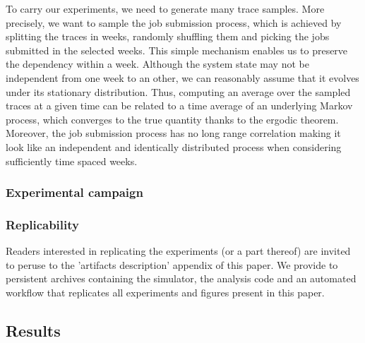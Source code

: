 \documentclass[sigconf,review]{acmart}
\begin{document}

To carry our experiments, we need to generate many trace samples. More
precisely, we want to sample the job submission process, which is achieved by
splitting the traces in weeks, randomly shuffling them and picking the jobs
submitted in the selected weeks.  This simple mechanism enables us to preserve
the dependency within a week. Although the system state may not be independent
from one week to an other, we can reasonably assume that it evolves under its
stationary distribution. Thus, computing an average over the sampled traces at
a given time can be related to a time average of an underlying Markov process,
which converges to the true quantity thanks to the ergodic theorem.  Moreover,
the job submission process has no long range correlation making it look like an
independent and identically distributed process when considering sufficiently
time spaced weeks.

\subsubsection{Experimental campaign}


\subsubsection{Replicability}

Readers interested in replicating the experiments (or a part thereof) are
invited to peruse to the 'artifacts description' appendix of this paper.  We
provide to persistent archives containing the simulator, the analysis code and
an automated workflow that replicates all experiments and figures present in
this paper.

\subsection{Results}
\label{sub:results}
\end{document}
